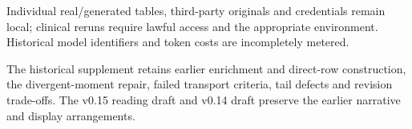\documentclass[sigconf,anonymous,review]{acmart}
\begin{document}
Individual real/\allowbreak{}generated tables, third-party originals and credentials remain local; clinical reruns require lawful access and the appropriate environment. Historical model identifiers and token costs are incompletely metered.


The historical supplement retains earlier enrichment and direct-row construction, the divergent-moment repair, failed transport criteria, tail defects and revision trade-offs. The v0.15 reading draft and v0.14 draft preserve the earlier narrative and display arrangements.
\end{document}

